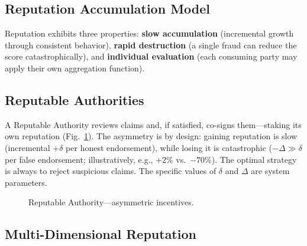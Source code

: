 \documentclass[11pt,a4paper,twocolumn]{article}
\begin{document}
\subsection{Reputation Accumulation Model}

Reputation exhibits three properties: \textbf{slow accumulation} (incremental growth through consistent behavior), \textbf{rapid destruction} (a single fraud can reduce the score catastrophically), and \textbf{individual evaluation} (each consuming party may apply their own aggregation function).

\subsection{Reputable Authorities}

A Reputable Authority reviews claims and, if satisfied, co-signs them---staking its own reputation (Fig.~\ref{fig:authority}). The asymmetry is by design: gaining reputation is slow (incremental $+\delta$ per honest endorsement), while losing it is catastrophic ($-\Delta \gg \delta$ per false endorsement; illustratively, e.g., $+2\%$ vs.\ $-70\%$). The optimal strategy is always to reject suspicious claims. The specific values of $\delta$ and $\Delta$ are system parameters.

\begin{figure}[ht]
\centering
{}
\caption{Reputable Authority---asymmetric incentives.}
\label{fig:authority}
\end{figure}

\subsection{Multi-Dimensional Reputation}
\end{document}
